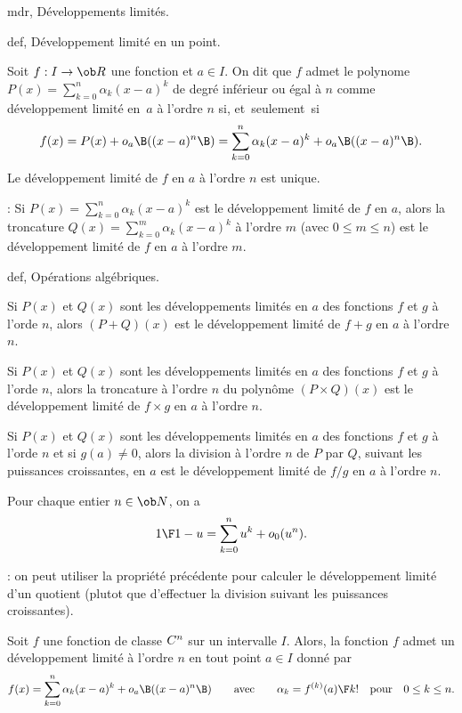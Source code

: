 \Section mdr, Développements limités. 

\Subsection def, Développement limité en un point. 
\bigskip

\Definition []  Soit $f:I\to\ob R$ une fonction et $a\in I$. On dit que $f$ admet le polynome $P(x)=\sum_{k=0}^n\alpha_k(x-a)^k$
 de degré inférieur ou égal à $n$ comme développement limité en~$a$ à l'ordre $n$ si, et~seulement~si 
$$
f(x)=P(x)+o_a\B((x-a)^n\B)=\sum_{k=0}^n\alpha_k(x-a)^k+o_a\B((x-a)^n\B).
$$
Le développement limité de $f$ en $a$ à l'ordre $n$ est unique. 
\bigskip

\Remarque : Si $P(x)=\sum_{k=0}^n\alpha_k(x-a)^k$ est le développement limité de $f$ en $a$, alors 
la troncature $Q(x)=\sum_{k=0}^m\alpha_k(x-a)^k$ à l'ordre $m$ (avec $0\le m\le n$) est le développement limité 
de $f$ en $a$ à l'ordre $m$. 
\bigskip

\Subsection def, Opérations algébriques. 

\Propriete []  Si $P(x)$ et $Q(x)$ sont les développements limités en $a$ des fonctions $f$ et $g$ à l'orde $n$, 
alors $(P+Q)(x)$ est le développement limité de $f+g$ en $a$ à l'ordre $n$. 
\bigskip


\Propriete []  Si $P(x)$ et $Q(x)$ sont les développements limités en $a$ des fonctions $f$ et $g$ à l'orde $n$, 
alors la troncature à l'ordre $n$ du polynôme $(P\times Q)(x)$ est le développement limité de $f\times g$ en $a$ à l'ordre $n$. 
\bigskip


\Propriete []  Si $P(x)$ et $Q(x)$ sont les développements limités en $a$ des fonctions $f$ et $g$ à l'orde $n$ 
et si $g(a)\neq0$, alors la division à l'ordre $n$ de $P$ par $Q$, suivant les puissances croissantes, 
en $a$ est le développement limité de $f/g$ en $a$ à l'ordre $n$. 
\bigskip

\Propriete []  Pour chaque entier $n\in\ob N$, on a 
$$
{1\F 1-u}=\sum_{k=0}^nu^k+o_0(u^n).
$$

\Remarque : on peut utiliser la propriété précédente pour calculer le développement limité d'un quotient (plutot que d'effectuer la division suivant les puissances croissantes). 
\bigskip

\Theoreme [Title=Formule de Taylor Young] 
Soit $f$ une fonction de classe $\sc C^n$ sur un intervalle $I$. 
Alors, la fonction $f$ admet un développement limité à l'ordre $n$ en tout point $a\in I$ donné par 
$$
f(x)=\sum_{k=0}^n\alpha_k(x-a)^k+o_a\B((x-a)^n\B)\qquad \mbox{avec}\qquad \alpha_k={f^{(k)}(a)\F k!}\quad\mbox{pour}\quad 0\le k\le n. 
$$

